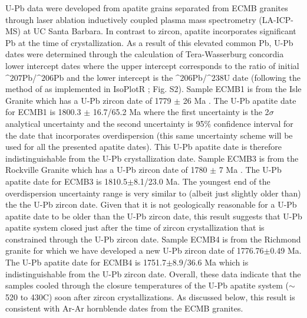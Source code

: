 \documentclass[draft]{agujournal2019}
\begin{document}
U-Pb data were developed from apatite grains separated from ECMB granites through laser ablation inductively coupled plasma mass spectrometry (LA-ICP-MS) at UC Santa Barbara. In contrast to zircon, apatite incorporates significant Pb at the time of crystallization. As a result of this elevated common Pb, U-Pb dates were determined through the calculation of Tera-Wasserburg concordia lower intercept dates where the upper intercept corresponds to the ratio of initial $\^{207}$Pb/$\^{206}$Pb and the lower intercept is the $\^{206}$Pb/$\^{238}$U date (following the method of  as implemented in IsoPlotR ; Fig. S2). Sample ECMB1 is from the Isle Granite which has a U-Pb zircon date of 1779 $\pm$ 26 Ma \cite{Holm2005a}. The U-Pb apatite date for ECMB1 is 1800.3 $\pm$ 16.7/65.2 Ma where the first uncertainty is the 2$\sigma$ analytical uncertainty and the second uncertainty is 95$\%$ confidence interval for the date that incorporates overdispersion (this same uncertainty scheme will be used for all the presented apatite dates). This U-Pb apatite date is therefore indistinguishable from the U-Pb crystallization date. Sample ECMB3 is from the Rockville Granite which has a U-Pb zircon date of 1780 $\pm$ 7 Ma \cite{Holm2005a}. The U-Pb apatite date for ECMB3 is 1810.5$\pm$8.1/23.0 Ma. The youngest end of the overdispersion uncertainty range is very similar to (albeit just slightly older than) the the U-Pb zircon date. Given that it is not geologically reasonable for a U-Pb apatite date to be older than the U-Pb zircon date, this result suggests that U-Pb apatite system closed just after the time of zircon crystallization that is constrained through the U-Pb zircon date.  Sample ECMB4 is from the Richmond granite for which we have developed a new U-Pb zircon date of 1776.76$\pm$0.49 Ma. The U-Pb apatite date for ECMB4 is 1751.7$\pm$8.9/36.6 Ma which is indistinguishable from the U-Pb zircon date. Overall, these data indicate that the samples cooled through the closure temperatures of the U-Pb apatite system ($\sim$ 520 to 430\textdegree C) soon after zircon crystallizations. As discussed below, this result is consistent with Ar-Ar hornblende dates from the ECMB granites.

%
%
%
%
%
%
%
%
%
%
\end{document}
